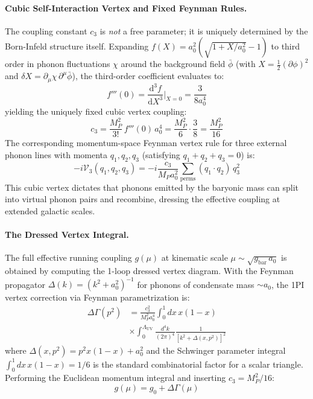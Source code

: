 \documentclass[aps,prd,10pt,twocolumn,superscriptaddress,nofootinbib,floatfix]{revtex4-2}
\begin{document}
\paragraph{Cubic Self-Interaction Vertex and Fixed Feynman Rules.}
The coupling constant $c_3$ is \emph{not} a free parameter; it is uniquely determined by the Born-Infeld structure itself. Expanding $f(X) = a_0^2(\sqrt{1+X/a_0^2}-1)$ to third order in phonon fluctuations $\chi$ around the background field $\bar\phi$ (with $X = \frac{1}{2}(\partial\phi)^2$ and $\delta X = \partial_\mu\chi\,\partial^\mu\bar\phi$), the third-order coefficient evaluates to:
\begin{equation}
f'''(0) = \frac{\mathrm{d}^3 f}{\mathrm{d}X^3}\bigg|_{X=0} = \frac{3}{8a_0^4}
\end{equation}
yielding the uniquely fixed cubic vertex coupling:
\begin{equation}
c_3 = \frac{M_P^2}{3!}\,f'''(0)\,a_0^4 = \frac{M_P^2}{6}\cdot\frac{3}{8} = \frac{M_P^2}{16}
\end{equation}
The corresponding momentum-space Feynman vertex rule for three external phonon lines with momenta $q_1, q_2, q_3$ (satisfying $q_1+q_2+q_3=0$) is:
\begin{equation}
-i\mathcal{V}_3(q_1,q_2,q_3) = -i\frac{c_3}{M_P a_0^2}\sum_{\text{perms}}(q_1\cdot q_2)\,q_3^2
\end{equation}
This cubic vertex dictates that phonons emitted by the baryonic mass can split into virtual phonon pairs and recombine, dressing the effective coupling at extended galactic scales.

\paragraph{The Dressed Vertex Integral.}
The full effective running coupling $g(\mu)$ at kinematic scale $\mu \sim \sqrt{g_{\text{bar}}\,a_0}$ is obtained by computing the 1-loop dressed vertex diagram. With the Feynman propagator $\Delta(k) = (k^2 + a_0^2)^{-1}$ for phonons of condensate mass $\sim a_0$, the 1PI vertex correction via Feynman parametrization is:
\begin{align}
\Delta\Gamma(p^2) &= \frac{c_3^2}{M_P^2 a_0^4}\int_0^1 dx\,x(1-x) \nonumber \\
&\times \int_0^{\Lambda_{\text{UV}}} \frac{d^4k}{(2\pi)^4}\frac{1}{[k^2 + \Delta(x,p^2)]^2}
\end{align}
where $\Delta(x,p^2) = p^2 x(1-x) + a_0^2$ and the Schwinger parameter integral $\int_0^1 dx\,x(1-x) = 1/6$ is the standard combinatorial factor for a scalar triangle. Performing the Euclidean momentum integral and inserting $c_3 = M_P^2/16$:
\begin{equation}
g(\mu) = g_0 + \Delta\Gamma(\mu)
\end{equation}
\end{document}
